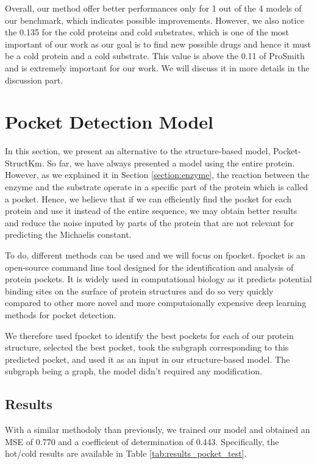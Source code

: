 Overall, our method offer better performances only for 1 out of the 4 models of our benchmark, which indicates possible improvements. However, we also notice the 0.135 for the cold proteins and cold substrates, which is one of the most important of our work as our goal is to find new possible drugs and hence it must be a cold protein and a cold substrate. This value is above the 0.11 of ProSmith and is extremely important for our work. We will discuss it in more details in the discussion part.

\section{Pocket Detection Model}

In this section, we present an alternative to the structure-based model, Pocket-StructKm. So far, we have always presented a model using the entire protein. However, as we explained it in Section \ref{section:enzyme}, the reaction between the enzyme and the substrate operate in a specific part of the protein which is called a pocket. Hence, we believe that if we can efficiently find the pocket for each protein and use it instead of the entire sequence, we may obtain better results and reduce the noise inputed by parts of the protein that  are not relevant for predicting the Michaelis constant. 

To do, different methods can be used and we will focus on fpocket. \cite{LeGuilloux2009Fpocket} fpocket is an open-source command line tool designed for the identification and analysis of protein pockets. It is widely used in computational biology as it predicts potential binding sites on the surface of protein structures and do so very quickly compared to other more novel and more computaionally expensive deep learning methods for pocket detection.

We therefore used fpocket to identify the best pockets for each of our protein structure, selected the best pocket, took the subgraph corresponding to this predicted pocket, and used it as an input in our structure-based model. The subgraph  being a graph, the model didn't required any modification. 

\subsection{Results}

With a similar methodoly than previously, we trained our model and obtained an MSE of 0.770 and a coefficient of determination of 0.443. Specifically, the hot/cold results are available in Table \ref{tab:results_pocket_test}.

